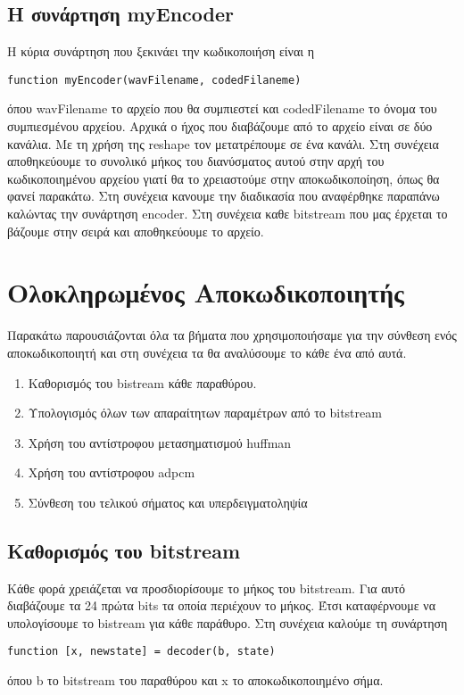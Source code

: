 \subsection{Η συνάρτηση myEncoder}
\par Η κύρια συνάρτηση που ξεκινάει την κωδικοποιήση είναι η 
\begin{lstlisting}[style=MyMatlab]
 function myEncoder(wavFilename, codedFilaneme)
\end{lstlisting}
όπου wavFilename το αρχείο που θα συμπιεστεί και codedFilename το όνομα του 
συμπιεσμένου αρχείου. Αρχικά ο ήχος που διαβάζουμε από το αρχείο είναι σε δύο 
κανάλια. Με τη χρήση της reshape τον μετατρέπουμε σε ένα κανάλι. Στη συνέχεια 
αποθηκεύουμε το συνολικό μήκος του διανύσματος αυτού στην αρχή του κωδικοποιημένου 
αρχείου γιατί θα το χρειαστούμε στην αποκωδικοποίηση, όπως θα φανεί παρακάτω. Στη συνέχεια 
κανουμε την διαδικασία που αναφέρθηκε παραπάνω καλώντας την συνάρτηση encoder. Στη συνέχεια 
καθε bitstream που μας έρχεται το βάζουμε στην σειρά και αποθηκεύουμε το αρχείο.


\section{Ολοκληρωμένος Αποκωδικοποιητής}
\par Παρακάτω παρουσιάζονται όλα τα βήματα που χρησιμοποιήσαμε για την σύνθεση ενός 
αποκωδικοποιητή και στη συνέχεια τα θα αναλύσουμε το κάθε ένα από αυτά.
\begin{enumerate}
\item Καθορισμός του bistream κάθε παραθύρου.
\item Υπολογισμός όλων των απαραίτητων παραμέτρων από το bitstream
\item Χρήση του αντίστροφου μετασηματισμού huffman
\item Χρήση του αντίστροφου adpcm
\item Σύνθεση του τελικού σήματος και υπερδειγματοληψία
\end{enumerate}

\subsection{Καθορισμός του bitstream}
\par Κάθε φορά χρειάζεται να προσδιορίσουμε το μήκος του bitstream. Για 
αυτό διαβάζουμε τα 24 πρώτα bits τα οποία περιέχουν το μήκος. Έτσι καταφέρνουμε 
να υπολογίσουμε το bistream για κάθε παράθυρο. Στη συνέχεια καλούμε τη συνάρτηση 
\begin{lstlisting}[style=MyMatlab]
 function [x, newstate] = decoder(b, state)
\end{lstlisting}
όπου b το bitstream του παραθύρου και x το αποκωδικοποιημένο σήμα.

